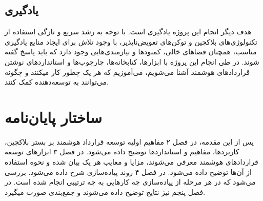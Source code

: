 \subsection{یادگیری}
هدف دیگر انجام این پروژه یادگیری است.
با توجه به رشد سریع و تازگی استفاده از تکنولوژی‌های بلاکچین و توکن‌های تعویض‌ناپذیر،
با وجود تلاش برای ایجاد منابع یادگیری مناسب، همچنان فضاهای خالی، کمبودها و نیازمندی‌هایی وجود دارد که باید پاسخ گفته شوند.
در طی انجام این پروژه با ابزارها، کتابخانه‌ها، چارچوب‌ها و استانداردهای نوشتن قراردادهای هوشمند آشنا می‌شویم،
می‌آموزیم که هر یک چطور کار میکنند و چگونه می‌توانند به توسعه‌دهنده کمک کنند.

\section{ساختار پایان‌نامه}
پس از این مقدمه، در فصل ۲ مفاهیم اولیه توسعه قرارداد هوشمند بر بستر بلاکچین، کاربردها، مفاهیم و استاندارد‌ها توضیح داده می‌شود.
در فصل ۳ ابزار‌های توسعه قرارداد‌های هوشمند معرفی می‌شوند،
مزایا و معایب هر یک بیان شده و نحوه استفاده از آن‌ها توضیح داده می‌شود.
در فصل ۴ روند پیاده‌سازی شرح داده می‌شود. بررسی می‌شود که در هر مرحله از پیاده‌سازی چه کارهایی به چه ترتیبی انجام شده است.
در فصل پنجم نیز نتایج توضیح داده می‌شوند و جمع‌بندی صورت میگیرد.
